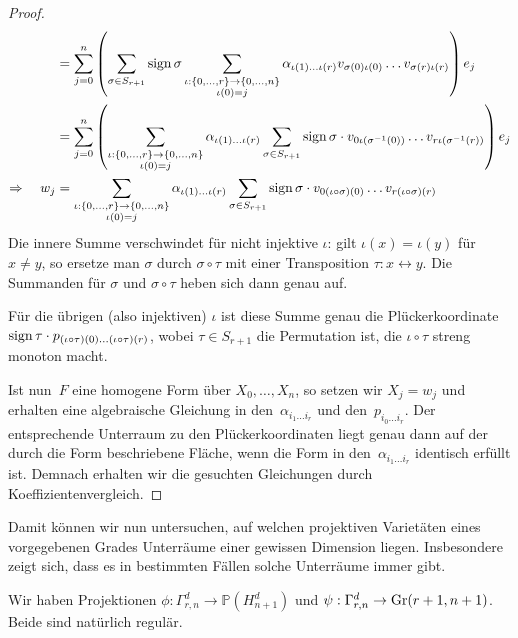 \begin{proof}
\begin{align*}
	&= \sum_{j=0}^n \left(\sum\limits_{\sigma \in S_{r+1}} \operatorname{sign} \sigma \sum_{\substack{\iota: \{0, \dots, r\} \rightarrow \{0, \dots, n\} \\ \iota(0)=j }} \alpha_{\iota(1) \dots \iota(r)} v_{\sigma(0)\iota(0)} \dots v_{\sigma(r)\iota(r)}\right) e_j \\
	&= \sum_{j=0}^n \left(\sum_{\substack{\iota: \{0, \dots, r\} \rightarrow \{0, \dots, n\} \\ \iota(0)=j }} \alpha_{\iota(1) \dots \iota(r)} \sum\limits_{\sigma \in S_{r+1}} \operatorname{sign} \sigma \cdot v_{0\iota(\sigma^{-1}(0))} \dots v_{r\iota(\sigma^{-1}(r))}\right) e_j \\
\Rightarrow\quad w_j	&= \sum_{\substack{\iota: \{0, \dots, r\} \rightarrow \{0, \dots, n\} \\ \iota(0)=j }} \alpha_{\iota(1) \dots \iota(r)} \sum\limits_{\sigma \in S_{r+1}} \operatorname{sign} \sigma \cdot v_{0(\iota\circ\sigma)(0)} \dots v_{r(\iota\circ\sigma)(r)}
\end{align*}
Die innere Summe verschwindet für nicht injektive $\iota$: gilt $\iota(x) = \iota(y)$ für $x \neq y$, so ersetze man $\sigma$ durch $\sigma \circ \tau$ mit einer Transposition $\tau: x \leftrightarrow y$. Die Summanden für $\sigma$ und $\sigma \circ \tau$ heben sich dann genau auf.

Für die übrigen (also injektiven) $\iota$ ist diese Summe genau die Plückerkoordinate $\operatorname{sign} \tau \cdot p_{(\iota\circ\tau)(0)\dots(\iota\circ\tau)(r)}$, wobei $\tau \in S_{r+1}$ die Permutation ist, die $\iota \circ \tau$ streng monoton macht.

Ist nun~$F$ eine homogene Form über $X_0, \dots, X_n$, so setzen wir $X_j = w_j$ und erhalten eine algebraische Gleichung in den~$\alpha_{i_1 \dots i_r}$ und den~$p_{i_0 \dots i_r}$. Der entsprechende Unterraum zu den Plückerkoordinaten liegt genau dann auf der durch die Form beschriebene Fläche, wenn die Form in den~$\alpha_{i_1 \dots i_r}$ identisch erfüllt ist. Demnach erhalten wir die gesuchten Gleichungen durch Koeffizientenvergleich.
\end{proof}

Damit können wir nun untersuchen, auf welchen projektiven Varietäten eines vorgegebenen Grades Unterräume einer gewissen Dimension liegen. Insbesondere zeigt sich, dass es in bestimmten Fällen solche Unterräume immer gibt.

Wir haben Projektionen $\phi \colon \Gamma_{r,n}^d \to \mathbb P(H_{n+1}^d)$ und $\psi: \Gamma_{r,n}^d \to \grass r+1/{n+1}$. Beide sind natürlich regulär.

